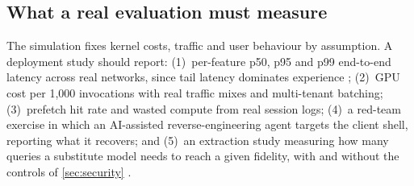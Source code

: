 \subsection{What a real evaluation must measure}\label{sec:realeval}
The simulation fixes kernel costs, traffic and user behaviour by assumption. A deployment
study should report:
(1)~per-feature p50, p95 and p99 end-to-end latency across real networks, since tail latency
dominates experience \cite{dean2013tail};
(2)~GPU cost per 1,000 invocations with real traffic mixes and multi-tenant batching;
(3)~prefetch hit rate and wasted compute from real session logs;
(4)~a red-team exercise in which an AI-assisted reverse-engineering agent targets the client
shell, reporting what it recovers; and
(5)~an extraction study measuring how many queries a substitute model needs to reach a given
fidelity, with and without the controls of \cref{sec:security}
\cite{tramer2016stealing,juuti2019prada,orekondy2019knockoff}.
